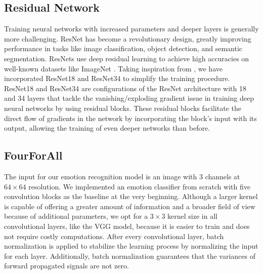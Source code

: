 \subsection{Residual Network}
Training neural networks with increased parameters and deeper layers is generally more challenging. ResNet has become a revolutionary design, greatly improving performance in tasks like image classification, object detection, and semantic segmentation. ResNets use deep residual learning to achieve high accuracies on well-known datasets like ImageNet \cite{deng2009imagenet}. Taking inspiration from \cite{he2016deep}, we have incorporated ResNet18 and ResNet34 to simplify the training procedure. ResNet18 and ResNet34 are configurations of the ResNet architecture with 18 and 34 layers that tackle the vanishing/exploding gradient issue in training deep neural networks by using residual blocks. These residual blocks facilitate the direct flow of gradients in the network by incorporating the block's input with its output, allowing the training of even deeper networks than before.

\subsection{FourForAll}
The input for our emotion recognition model is an image with $3$ channels at ${64 \times 64}$ resolution. We implemented an emotion classifier from scratch with five convolution blocks as the baseline at the very beginning. Although a larger kernel is capable of offering a greater amount of information and a broader field of view because of additional parameters, we opt for a ${3 \times 3}$ kernel size in all convolutional layers, like the VGG model, because it is easier to train and does not require costly computations. After every convolutional layer, batch normalization is applied to stabilize the learning process by normalizing the input for each layer. Additionally, batch normalization guarantees that the variances of forward propagated signals are not zero.
